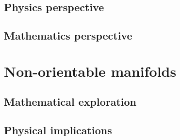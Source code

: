 \documentclass[11pt,a4paper]{report}
\theoremstyle{definition}
\theoremstyle{remark}
\newcommand{\?}{\stackrel{?}{=}}
\begin{document}
\section{Physics perspective}

\section{Mathematics perspective}


\chapter{Non-orientable manifolds}

\section{Mathematical exploration}

\section{Physical implications}

\printbibliography
	
	
\end{document}
